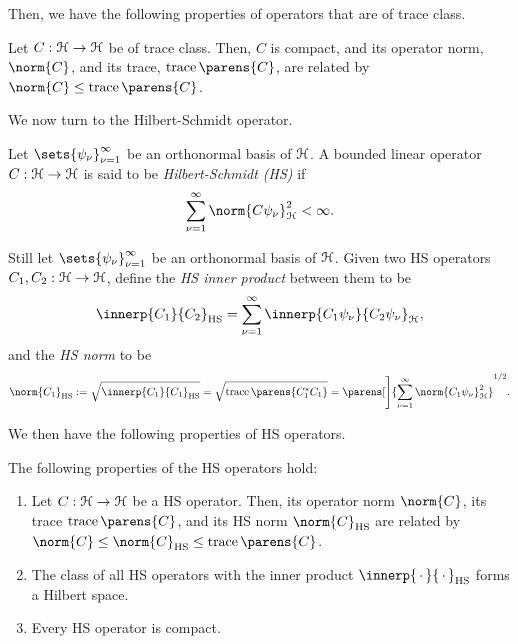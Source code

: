 Then, we have the following properties of operators that are of trace class. 

\begin{proposition}
	Let $C: \mathcal{H} \to \mathcal{H}$ be of trace class. Then, $C$ is compact, and its operator norm, $\norm{C}$, and its trace, $\tr \parens{C}$, are related by $\norm{C} \le \tr \parens{C}$. 
\end{proposition}

We now turn to the Hilbert-Schmidt operator. 

\begin{definition}
	Let $\sets{\psi_{\nu}}_{\nu=1}^{\infty}$ be an orthonormal basis of $\mathcal{H}$. A bounded linear operator $C: \mathcal{H} \to \mathcal{H}$ is said to be \textit{Hilbert-Schmidt (HS)} if 
	\begin{align*}
		\sum_{\nu=1}^{\infty} \norm{C \psi_{\nu}}^2_{\calH} < \infty. 
	\end{align*}
\end{definition}

Still let $\sets{\psi_{\nu}}_{\nu=1}^{\infty}$ be an orthonormal basis of $\mathcal{H}$. Given two HS operators $C_1, C_2: \mathcal{H} \to \mathcal{H}$, define the \textit{HS inner product} between them to be 
\begin{align*}
	\innerp{C_1}{C_2}_{\mathrm{HS}} = \sum_{\nu=1}^{\infty} \innerp{C_1 \psi_{\nu}}{C_2 \psi_{\nu}}_{\hil}, 
\end{align*}
and the \textit{HS norm} to be 
\begin{align*}
	\norm{C_1}_{\mathrm{HS}} := \sqrt{\innerp{C_1}{C_1}_{\mathrm{HS}}} = \sqrt{\tr \parens{C_1^* C_1}} = \parens[\Bigg]{\sum_{\nu=1}^{\infty} \norm{C_1 \psi_{\nu}}^2_{\hil}}^{1/2}. 
\end{align*}

We then have the following properties of HS operators. 

\begin{proposition}\label{prop-hs-property}
	The following properties of the HS operators hold: 
	\begin{enumerate}[label=(\alph*)]
		\item \label{prop-hs-property-a} Let $C: \mathcal{H} \to \mathcal{H}$ be a HS operator. Then, its operator norm $\norm{C}$, its trace $\trace \parens{C}$, and its HS norm $\norm{C}_{\mathrm{HS}}$ are related by $\norm{C} \le \norm{C}_{\mathrm{HS}} \le \trace \parens{C}$. 
		\item \label{prop-hs-property-b} The class of all HS operators with the inner product $\innerp{\,\cdot\,}{\,\cdot\,}_{\mathrm{HS}}$ forms a Hilbert space. 
		\item \label{prop-hs-property-c} Every HS operator is compact. 
	\end{enumerate}
\end{proposition}

